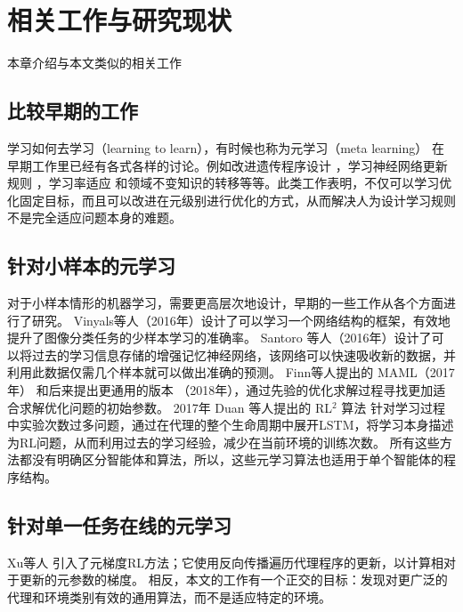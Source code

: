 \chapter{相关工作与研究现状}
\label{cha:sysu-thesis-latex-install-guide}

本章介绍与本文类似的相关工作


\section{比较早期的工作}
学习如何去学习（learning to learn），有时候也称为元学习（meta learning）\cite{MetaLearningComputer2021} 在早期工作里已经有各式各样的讨论。例如改进遗传程序设计\cite{ohDiscoveringReinforcementLearning2020} \cite{schmidhuberEvolutionaryPrinciplesSelfreferential1987}，学习神经网络更新规则 \cite{bengioLearningSynapticLearning1990}，学习率适应 \cite{suttonAdaptingBiasGradient1992} 和领域不变知识的转移\cite{thrunLearningOneMore1994}等等。此类工作表明，不仅可以学习优化固定目标，而且可以改进在元级别进行优化的方式，从而解决人为设计学习规则不是完全适应问题本身的难题。


\section{针对小样本的元学习}
对于小样本情形的机器学习，需要更高层次地设计，早期的一些工作从各个方面进行了研究。
Vinyals等人\cite{vinyalsMatchingNetworksOne2016b}（2016年）设计了可以学习一个网络结构的框架，有效地提升了图像分类任务的少样本学习的准确率。
Santoro 等人\cite{santoroMetaLearningMemoryAugmentedNeural2016}（2016年）设计了可以将过去的学习信息存储的增强记忆神经网络，该网络可以快速吸收新的数据，并利用此数据仅需几个样本就可以做出准确的预测。
Finn等人提出的 MAML（2017年）\cite{finnModelagnosticMetalearningFast2017} 和后来提出更通用的版本 \cite{finnMetaLearningUniversalityDeep2018}（2018年），通过先验的优化求解过程寻找更加适合求解优化问题的初始参数。
2017年 Duan 等人提出的 RL$^2$ 算法 \cite{duanRLFastReinforcement2016} 针对学习过程中实验次数过多问题，通过在代理的整个生命周期中展开LSTM，将学习本身描述为RL问题，从而利用过去的学习经验，减少在当前环境的训练次数。
所有这些方法都没有明确区分智能体和算法，所以，这些元学习算法也适用于单个智能体的程序结构。


\section{针对单一任务在线的元学习}
Xu等人\cite{xuMetagradientReinforcementLearning2018} 引入了元梯度RL方法；它使用反向传播遍历代理程序的更新，以计算相对于更新的元参数的梯度。
相反，本文的工作有一个正交的目标：发现对更广泛的代理和环境类别有效的通用算法，而不是适应特定的环境。

